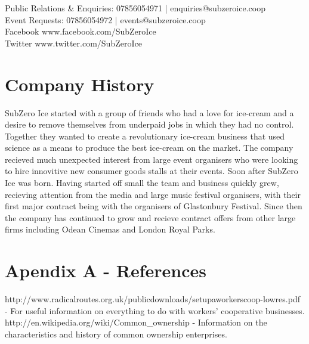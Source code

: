 \documentclass{article}
\begin{document}
Public Relations \& Enquiries: 07856054971 | enquiries@subzeroice.coop \\

Event Requests: 07856054972 | events@subzeroice.coop \\

Facebook www.facebook.com/SubZeroIce \\
Twitter www.twitter.com/SubZeroIce


\section{Company History}

SubZero Ice started with a group of friends who had a love for ice-cream and a desire to remove themselves from underpaid jobs in which they had no control. Together they wanted to create a revolutionary ice-cream business that used science as a means to produce the best ice-cream on the market. The company recieved much unexpected interest from large event organisers who were looking to hire innovitive new consumer goods stalls at their events. Soon after SubZero Ice was born. Having started off small the team and business quickly grew, recieving attention from the media and large music festival organisers, with their first major contract being with the organisers of Glastonbury Festival. Since then the company has continued to grow and recieve contract offers from other large firms including Odean Cinemas and London Royal Parks.

\section{Apendix A - References}

http://www.radicalroutes.org.uk/publicdownloads/setupaworkerscoop-lowres.pdf - For useful information on everything to do with workers' cooperative businesses.
http://en.wikipedia.org/wiki/Common_ownership - Information on the characteristics and history of common ownership enterprises.
\end{document}
